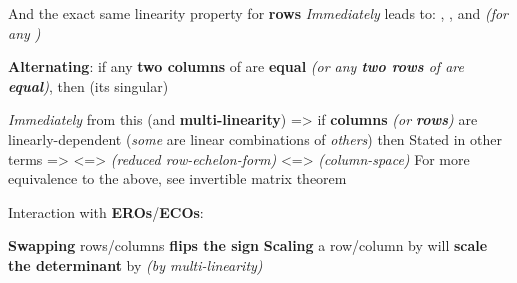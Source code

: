\begin{itemize}
            \begin{itemize}

                  \vItem
                        And the exact same linearity property for \textbf{rows}
                  \vItem
                        \emph{Immediately} leads to: ,
                        , and 
                        \emph{(for any )}
            \end{itemize}
      \vItem
            \textbf{Alternating}: if any \textbf{two columns} of  are
            \textbf{equal} \emph{(or any \textbf{two rows} of  are
                  \textbf{equal})}, then  (its singular)

            \begin{itemize}

                  \vItem
                        \emph{Immediately} from this (and \textbf{multi-linearity})
                        => if \textbf{columns} \emph{(or \textbf{rows})} are
                        linearly-dependent (\emph{some} are linear combinations of
                        \emph{others}) then 
                  \vItem
                        Stated in other terms =>
                         \textless=>
                         \emph{(reduced
                              row-echelon-form)} \textless=>
                        \emph{(column-space)}
                  \vItem
                        For more equivalence to the above, see invertible matrix theorem
            \end{itemize}
      \vItem
            Interaction with \textbf{EROs}/\textbf{ECOs}:

            \begin{itemize}

                  \vItem
                        \textbf{Swapping} rows/columns \textbf{flips the sign}
                  \vItem
                        \textbf{Scaling} a row/column by  will
                        \textbf{scale the determinant} by \iMbox{\lambda} \emph{(by
                              multi-linearity)}

                        \begin{itemize}


\end{itemize}
\end{itemize}
\end{itemize}
